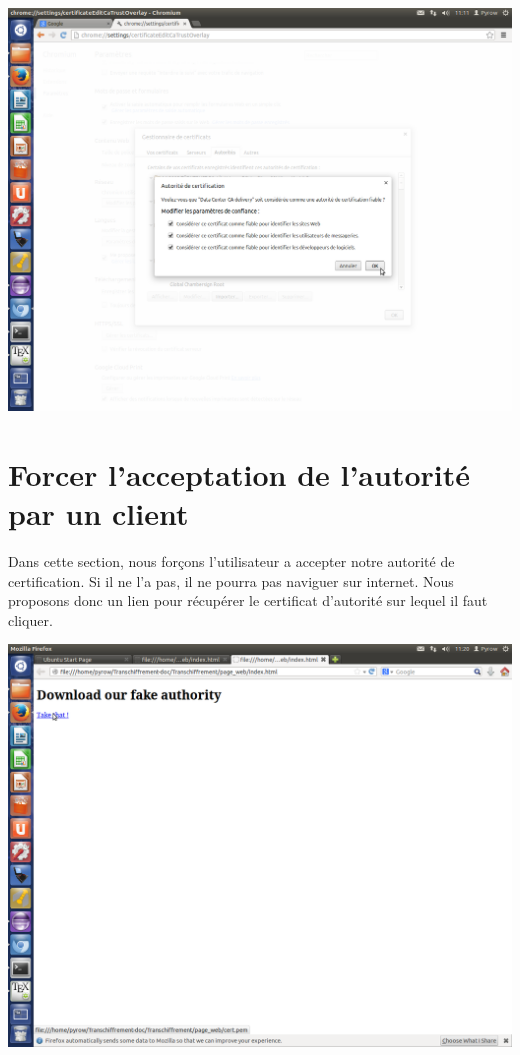 \includegraphics[width=\textwidth]{images_autorites/ChromeValide.png} 
\newpage

\section{Forcer l'acceptation de l'autorité par un client}
Dans cette section, nous forçons l'utilisateur a accepter notre autorité de certification. Si il ne l'a pas, il ne pourra pas naviguer sur internet.
Nous proposons donc un lien pour récupérer le certificat d'autorité sur lequel il faut cliquer.

\includegraphics[width=\textwidth]{images_autorites/Page.png} 
\newpage

